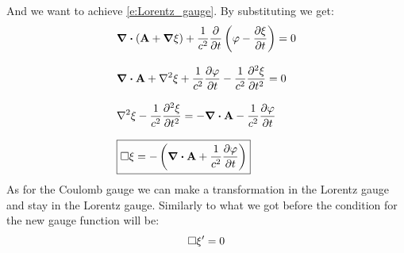 And we want to achieve \eqref{e:Lorentz_gauge}. By substituting we get:
\begin{equation}
  \begin{split}
    &\div{\brackets{\vec{A} + \grad{\xi}}} + \dfrac{1}{c^2} \pdv{}{t}\brackets{\potE - \pdv{\xi}{t}} = 0 \\[8pt]
    &\div{\vec{A}} + \lap{\xi} + \dfrac{1}{c^2} \pdv{\potE}{t} - \dfrac{1}{c^2} \pdv[2]{\xi}{t} = 0 \\[8pt]
    &\lap{\xi} - \dfrac{1}{c^2} \pdv[2]{\xi}{t} = -\div{\vec{A}} - \dfrac{1}{c^2} \pdv{\potE}{t} \\[8pt]
    &\boxed{\dalop \xi = -\brackets{\div{\vec{A}} + \dfrac{1}{c^2} \pdv{\potE}{t}}}
  \end{split}
\end{equation}
As for the Coulomb gauge we can make a transformation in the Lorentz gauge and stay in the Lorentz gauge. Similarly to what we got before the condition for the new gauge function will be:
\begin{equation}
  \square \xi' = 0
\end{equation}
